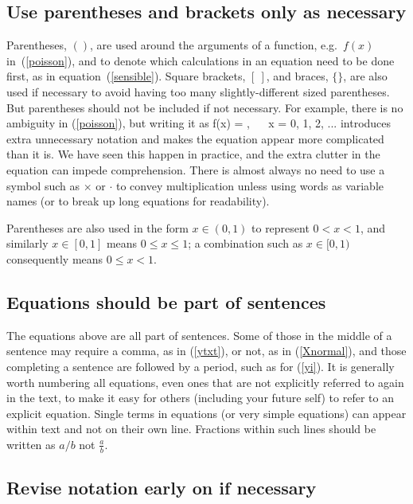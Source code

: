 \subsection*{Use parentheses and brackets only as necessary}

Parentheses, $()$,
are used
around the arguments of a function, e.g.~$f(x)$ in~(\ref{poisson}), and
to denote which calculations in an equation need to be done first, as
in equation~(\ref{sensible}). Square brackets, $[~]$, and braces, $\{\}$,
are also used if necessary to avoid having too many slightly-different sized
parentheses. But parentheses should not be included if not necessary.
For example, there is no ambiguity in (\ref{poisson}), but writing it as
\eb
f(x) = ,
  ~~ x = 0, 1, 2, ...
\label{poisson2}
\ee
introduces extra unnecessary notation and makes the equation appear more
complicated than it is. We have seen this happen in practice, and the extra
clutter in the equation can impede comprehension. There is almost always
no need to use a symbol such as $\times$ or $\cdot$
to convey multiplication unless using
words as variable names (or to break up long equations for readability).

Parentheses are also used in the form $x \in (0, 1)$ to represent $0 < x < 1$,
and similarly $x \in [0, 1]$ means $0 \leq x \leq 1$; a combination such as
$x \in [0, 1)$ consequently means $0 \leq x < 1$.

\subsection*{Equations should be part of sentences}

The equations above are all part of sentences. Some of those in the middle of
a sentence may require a comma, as in (\ref{ytxt}), or not, as in
(\ref{Xnormal}), and those completing a sentence are followed by a period,
such as for (\ref{yi}). It is generally worth numbering all equations,
even ones that are not explicitly referred to again in the text, to make it easy
for others (including your future self) to refer to an explicit equation.
Single terms in equations (or very simple equations) can appear within
text and not on their own line. Fractions within such lines should be
written as $a/b$ not $\frac{a}{b}$.

\subsection*{Revise notation early on if necessary}


